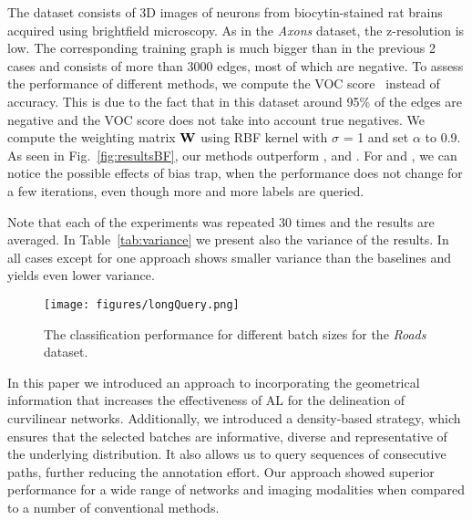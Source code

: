 \documentclass[10pt,twocolumn,letterpaper]{article}
\begin{document}
The dataset consists of 3D images of neurons from biocytin-stained rat brains acquired using brightfield microscopy. As in the \textit{Axons} dataset, the z-resolution is low. The corresponding training graph is much bigger than in the previous 2 cases and consists of more than 3000 edges, most of which are negative. To assess the performance of different methods, we compute the VOC score~\cite{Pascal-voc-2010} instead of accuracy. This is due to the fact that in this dataset around 95\% of the edges are negative and the VOC score does not take into account true negatives. We compute the weighting matrix $\mathbf{W}$ using RBF kernel with $\sigma$ = 1 and set $\alpha$ to 0.9. As seen in Fig.~\ref{fig:resultsBF}, our methods outperform \RS{}, \US{} and \QBC{}. For \US{} and \QBC{}, we can notice the possible effects of bias trap, when the performance does not change for a few iterations, even though more and more labels are queried.

Note that each of the experiments was repeated 30 times and the results are averaged. In Table~\ref{tab:variance} we present also the variance of the results. In all cases except for one \PPS{} approach shows smaller variance than the baselines and \DPS{} yields even lower variance. 

\begin{figure}[h]
\centering
\texttt{[image: figures/longQuery.png]}
\caption{The classification performance for different batch sizes for the \textit{Roads} dataset.}
\vspace{-3mm}
\label{fig:longQuery}
\end{figure}

In this paper we introduced an approach to incorporating the geometrical information that increases the effectiveness of AL for the delineation of curvilinear networks. Additionally, we introduced a density-based strategy, which ensures that the selected batches are informative, diverse and representative of the underlying distribution. It also allows us to query sequences of consecutive paths, further reducing the annotation effort. Our approach showed superior performance for a wide range of networks and imaging modalities when compared to a number of conventional methods.

{\small


}
\end{document}
